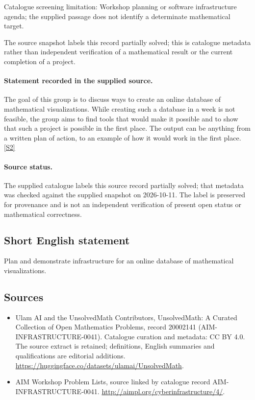 \documentclass[11pt]{article}
\begin{document}
Catalogue screening limitation: Workshop planning or software infrastructure agenda; the supplied passage does not identify a determinate mathematical target.

The source snapshot labels this record partially solved; this is catalogue metadata rather than independent verification of a mathematical result or the current completion of a project.
\paragraph{Statement recorded in the supplied source.}
The goal of this group is to discuss ways to create an online database of mathematical visualizations. While creating such a database in a week is not feasible, the group aims to find tools that would make it possible and to show that such a project is possible in the first place. The output can be anything from a written plan of action, to an example of how it would work in the first place. \href{http://aimpl.org/cyberinfrastructure/4/}{[S2]}
\paragraph{Source status.}
The supplied catalogue labels this source record partially solved; that metadata was checked against the supplied snapshot on 2026-10-11. The label is preserved for provenance and is not an independent verification of present open status or mathematical correctness.
\subsection{Short English statement}
Plan and demonstrate infrastructure for an online database of mathematical visualizations.
\subsection{Sources}
\begin{itemize}
\item[S1] Ulam AI and the UnsolvedMath Contributors, UnsolvedMath: A Curated Collection of Open Mathematics Problems, record 20002141 (AIM-INFRASTRUCTURE-0041). Catalogue curation and metadata: CC BY 4.0. The source extract is retained; definitions, English summaries and qualifications are editorial additions.
\url{https://huggingface.co/datasets/ulamai/UnsolvedMath}.
\item[S2] AIM Workshop Problem Lists, source linked by catalogue record AIM-INFRASTRUCTURE-0041.
\url{http://aimpl.org/cyberinfrastructure/4/}.
\end{itemize}
\end{document}
